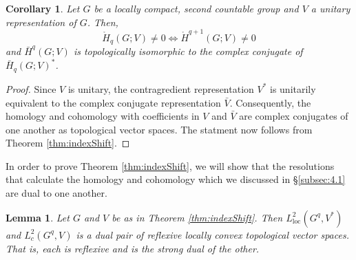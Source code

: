 \documentclass[12pt,reqno]{amsart}
\newtheorem{lemma}[theorem]{Lemma}
\newtheorem{corollary}[theorem]{Corollary}
\theoremstyle{definition}
\begin{document}
\begin{corollary}\label{cor:index shift unitary}
    Let $G$ be a locally compact, second countable group and $V$ a unitary representation of $G$. Then, 
    $$\mathring{H}_q(G;V) \ne 0 \iff \mathring{H}^{q+1}(G;V) \ne 0$$
    and $\bar{H}^q(G;V)$ is topologically isomorphic to the complex conjugate of  $\bar{H}_q(G;V)^*$.
\end{corollary}

\begin{proof}
     Since $V$ is unitary, the contragredient representation $V^*$ is unitarily equivalent to the complex conjugate representation $\bar{V}$. Consequently, the homology and cohomology with coefficients in $V$ and $\bar{V}$ are complex conjugates of one another as topological vector spaces. The statment now follows from Theorem  \ref{thm:indexShift}.
\end{proof}

In order to prove Theorem \ref{thm:indexShift}, we will show that the resolutions that calculate the homology and cohomology which we discussed in \S\ref{subsec:4.1} are dual to one another.
\begin{lemma}\label{lem:dual pair}
    Let $G$ and $V$ be as in Theorem \ref{thm:indexShift}. Then $L^2_{\mathrm{loc}}(G^{q},V^*)$ and $L^2_c(G^{q},V)$ is a dual pair of reflexive locally convex topological vector spaces. That is, each is reflexive and is the strong dual of the other.
\end{lemma}
\end{document}

